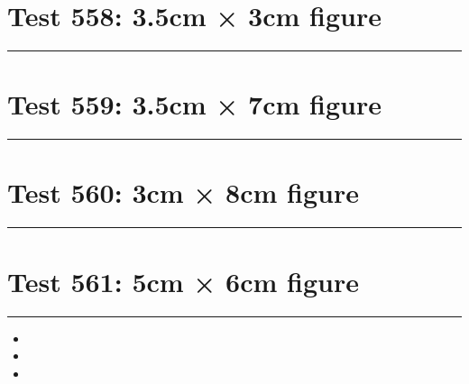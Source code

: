 \documentclass[a4paper,11pt]{article}
\begin{document}
\section*{Test 558: 3.5cm × 3cm figure}
\begin{swarmwrap}%
  \begin{minipage}[t]{3cm}
    \centering
    \rule{\linewidth}{3cm}
  \end{minipage}%
\end{swarmwrap}%
\swarmwrapnext
\lipsum[37]
\lipsum[38]
\lipsum[39]
\lipsum[40]
\section*{Test 559: 3.5cm × 7cm figure}
\begin{swarmwrap}%
  \begin{minipage}[t]{3cm}
    \centering
    \rule{\linewidth}{7cm}
  \end{minipage}%
\end{swarmwrap}%
\swarmwrapnext
\lipsum[3]
\lipsum[4]
\lipsum[5]
\lipsum[6]
\section*{Test 560: 3cm × 8cm figure}
\begin{swarmwrap}%
  \begin{minipage}[t]{3cm}
    \centering
    \rule{\linewidth}{8cm}
  \end{minipage}%
\end{swarmwrap}%
\swarmwrapnext
\lipsum[116]
\lipsum[117]
\lipsum[118]
\lipsum[119]
\section*{Test 561: 5cm × 6cm figure}
\begin{swarmwrap}%
  \begin{minipage}[t]{5cm}
    \centering
    \rule{\linewidth}{6cm}
  \end{minipage}%
\end{swarmwrap}%
\swarmwrapnext
\lipsum[78]
\begin{itemize}
  \item \lipsum[79][1-3]
  \item \lipsum[80][1-3]
  \item \lipsum[81][1-3]
\end{itemize}
\end{document}
